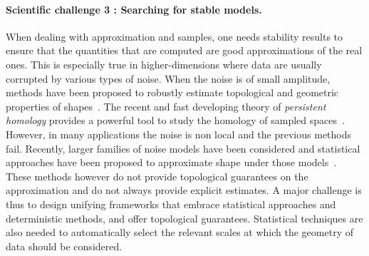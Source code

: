 





\paragraph{Scientific challenge 3 : Searching for stable models.} 
When dealing with approximation and samples, one needs stability results to ensure that the quantities that are computed are good approximations of the real ones. This is especially true in higher-dimensions where data are usually corrupted by various types of noise.  When the noise is of small amplitude, methods have been proposed to robustly estimate topological and geometric properties of shapes~\cite{geometrica-ccl09,nsw-tvu-2011}. 
 The recent and fast developing theory of {\em persistent homology} provides a powerful tool to study  the homology of sampled spaces~\cite{eh-ph-2008}.
However, in  many applications the noise is non local and the previous methods fail.
Recently,  larger families of noise models  have been considered and statistical approaches  have been proposed to approximate shape under  those models~\cite{gpvw-mme-2011}. These methods however do not provide topological guarantees on the approximation and do not always provide explicit estimates. A major challenge is thus to design  unifying frameworks that embrace statistical approaches and deterministic methods, and offer topological guarantees.   Statistical techniques are also needed to automatically select the relevant scales at which the geometry of data should be considered.

